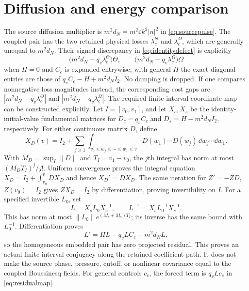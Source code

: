 \section{Diffusion and energy comparison}
The source diffusion multiplier is $m^2d_N=m^2\varepsilon k^2|n|^2$ in
\eqref{eq:sourcepulse}.  The coupled pair has the two retained physical losses
$\lambda_c^\Theta$ and $\lambda_c^\Omega$, which are generally unequal to
$m^2d_N$.  Their signed discrepancy in \eqref{eq:identitydefect} is explicitly
\begin{equation}
 \bigl(m^2d_N-q_v\lambda_c^\Theta\bigr)\Theta,
 \qquad
 \bigl(m^2d_N-q_v\lambda_c^\Omega\bigr)\Omega
\end{equation}
when $H=0$ and $C_c$ is expanded entrywise; with general $H$ the exact
diagonal entries are those of $q_vC_c-H+m^2d_NI_2$.  No damping is dropped.
If one compares nonnegative loss magnitudes instead, the corresponding cost
gaps are $|m^2d_N-q_v\lambda_c^\Theta|$ and
$|m^2d_N-q_v\lambda_c^\Omega|$.
The required finite-interval coordinate map can be constructed explicitly.
Let $I=[v_0,v_1]$, and let $X_c,X_s$ be the identity-initial-value
fundamental matrices for $D_c=q_vC_c$ and $D_s=H-m^2d_NI_2$,
respectively. For either continuous matrix $D$, define
\[
 X_D(v)=I_2+\sum_{j\ge1}
 \int_{v_0\le w_j\le\cdots\le w_1\le v}
 D(w_1)\cdots D(w_j)\,\dd w_j\cdots\dd w_1 .
\]
With $M_D=\sup_I\|D\|$ and $T_I=v_1-v_0$, the $j$th integral has norm
at most $(M_DT_I)^j/j!$. Uniform convergence proves the integral equation
$X_D=I_2+\int_{v_0}^vDX_D$ and hence $X_D'=DX_D$.
The same iteration for $Z'=-ZD$, $Z(v_0)=I_2$ gives $ZX_D=I_2$
by differentiation, proving invertibility on $I$. For a specified
invertible $L_0$, set
\[
 L=X_sL_0X_c^{-1},\qquad L^{-1}=X_cL_0^{-1}X_s^{-1}.
\]
This has norm at most $\|L_0\|e^{(M_c+M_s)T_I}$; its inverse has the
same bound with $L_0^{-1}$. Differentiation proves
\begin{equation}
 L'=HL-q_vLC_c-m^2d_NL,
 \label{eq:intertwiner}
\end{equation}
so the homogeneous embedded pair has zero projected residual. This proves
an actual finite-interval conjugacy along the retained coefficient path.
It does not make the source phase,
pressure, cutoff, or nonlinear covariance equal to the coupled Boussinesq fields.
For general controls $c_c$, the forced term is $q_vLc_c$ in
\eqref{eq:residualmap}.

